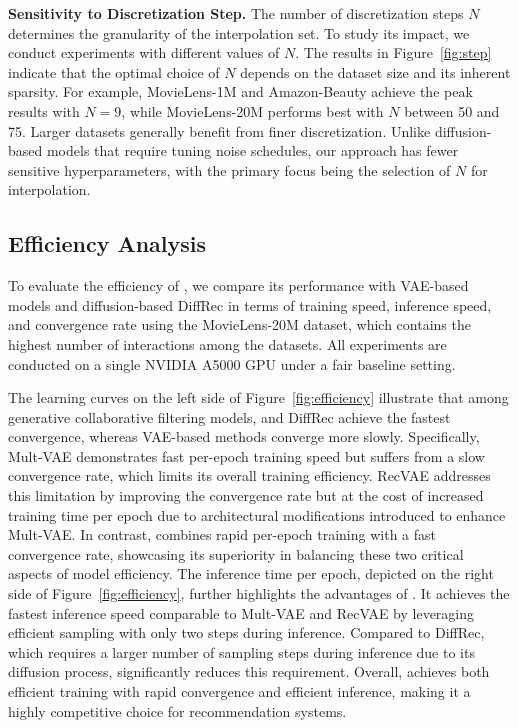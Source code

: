 \documentclass[sigconf]{acmart}
\begin{document}
\vspace{3pt}
\noindent \textbf{Sensitivity to Discretization Step.}
The number of discretization steps $N$ determines the granularity of the interpolation set. To study its impact, we conduct experiments with different values of $N$. The results in Figure~\ref{fig:step} indicate that the optimal choice of $N$ depends on the dataset size and its inherent sparsity. For example, MovieLens-1M and Amazon-Beauty achieve the peak results with $N = 9$, while MovieLens-20M performs best with $N$ between 50 and 75. Larger datasets generally benefit from finer discretization. Unlike diffusion-based models that require tuning noise schedules, our approach has fewer sensitive hyperparameters, with the primary focus being the selection of $N$ for interpolation.

\subsection{Efficiency Analysis}
To evaluate the efficiency of \ours, we compare its performance with VAE-based models and diffusion-based DiffRec in terms of training speed, inference speed, and convergence rate using the MovieLens-20M dataset, which contains the highest number of interactions among the datasets. All experiments are conducted on a single NVIDIA A5000 GPU under a fair baseline setting.

The learning curves on the left side of Figure~\ref{fig:efficiency} illustrate that among generative collaborative filtering models, \ours and DiffRec achieve the fastest convergence, whereas VAE-based methods converge more slowly. Specifically, Mult-VAE demonstrates fast per-epoch training speed but suffers from a slow convergence rate, which limits its overall training efficiency. RecVAE addresses this limitation by improving the convergence rate but at the cost of increased training time per epoch due to architectural modifications introduced to enhance Mult-VAE. In contrast, \ours combines rapid per-epoch training with a fast convergence rate, showcasing its superiority in balancing these two critical aspects of model efficiency.
The inference time per epoch, depicted on the right side of Figure~\ref{fig:efficiency}, further highlights the advantages of \ours. It achieves the fastest inference speed comparable to Mult-VAE and RecVAE by leveraging efficient sampling with only two steps during inference. Compared to DiffRec, which requires a larger number of sampling steps during inference due to its diffusion process, \ours significantly reduces this requirement.
Overall, \ours achieves both efficient training with rapid convergence and efficient inference, making it a highly competitive choice for recommendation systems.
\end{document}
